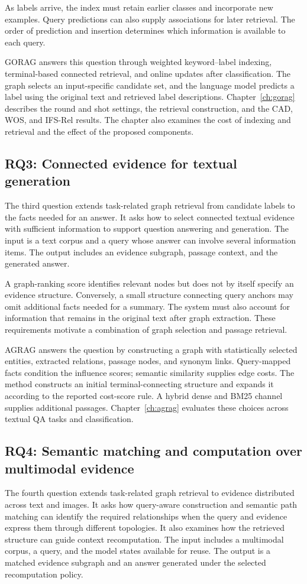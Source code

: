 As labels arrive, the index must retain earlier classes and incorporate new examples. Query predictions can also supply associations for later retrieval. The order of prediction and insertion determines which information is available to each query.

GORAG answers this question through weighted keyword--label indexing, terminal-based connected retrieval, and online updates after classification. The graph selects an input-specific candidate set, and the language model predicts a label using the original text and retrieved label descriptions. Chapter~\ref{ch:gorag} describes the round and shot settings, the retrieval construction, and the CAD, WOS, and IFS-Rel results. The chapter also examines the cost of indexing and retrieval and the effect of the proposed components.

\subsection{RQ3: Connected evidence for textual generation}
The third question extends task-related graph retrieval from candidate labels to the facts needed for an answer. It asks how to select connected textual evidence with sufficient information to support question answering and generation. The input is a text corpus and a query whose answer can involve several information items. The output includes an evidence subgraph, passage context, and the generated answer.

A graph-ranking score identifies relevant nodes but does not by itself specify an evidence structure. Conversely, a small structure connecting query anchors may omit additional facts needed for a summary. The system must also account for information that remains in the original text after graph extraction. These requirements motivate a combination of graph selection and passage retrieval.

AGRAG answers the question by constructing a graph with statistically selected entities, extracted relations, passage nodes, and synonym links. Query-mapped facts condition the influence scores; semantic similarity supplies edge costs. The method constructs an initial terminal-connecting structure and expands it according to the reported cost-score rule. A hybrid dense and BM25 channel supplies additional passages. Chapter~\ref{ch:agrag} evaluates these choices across textual QA tasks and classification.

\subsection{RQ4: Semantic matching and computation over multimodal evidence}
The fourth question extends task-related graph retrieval to evidence distributed across text and images. It asks how query-aware construction and semantic path matching can identify the required relationships when the query and evidence express them through different topologies. It also examines how the retrieved structure can guide context recomputation. The input includes a multimodal corpus, a query, and the model states available for reuse. The output is a matched evidence subgraph and an answer generated under the selected recomputation policy.

